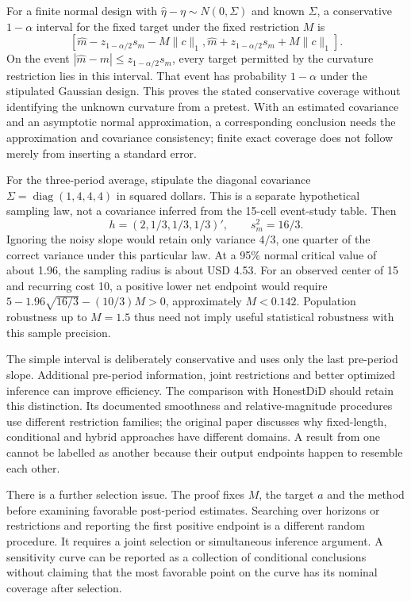 For a finite normal design with
$\widehat\eta-\eta\sim N(0,\Sigma)$ and known $\Sigma$, a conservative
$1-\alpha$ interval for the fixed target under the fixed restriction $M$ is
\begin{equation}
 \left[\widehat m-z_{1-\alpha/2}s_m-M\|c\|_1,
       \widehat m+z_{1-\alpha/2}s_m+M\|c\|_1\right].
 \label{exec17:s6-normal-interval}
\end{equation}
On the event $|\widehat m-m|\leq z_{1-\alpha/2}s_m$, every target
permitted by the curvature restriction lies in this interval. That event
has probability $1-\alpha$ under the stipulated Gaussian design. This
proves the stated conservative coverage without identifying the unknown
curvature from a pretest. With an estimated covariance and an asymptotic
normal approximation, a corresponding conclusion needs the approximation
and covariance consistency; finite exact coverage does not follow merely
from inserting a standard error.

For the three-period average, stipulate the diagonal covariance
$\Sigma=\operatorname{diag}(1,4,4,4)$ in squared dollars. This is a
separate hypothetical sampling law, not a covariance inferred from the
15-cell event-study table. Then
\begin{equation}
 h=(2,1/3,1/3,1/3)',\qquad s_m^2=16/3.
 \label{exec17:s6-normal-design}
\end{equation}
Ignoring the noisy slope would retain only variance $4/3$, one quarter
of the correct variance under this particular law. At a 95\% normal
critical value of about 1.96, the sampling radius is about USD 4.53.
For an observed center of 15 and recurring cost 10, a positive lower
net endpoint would require
$5-1.96\sqrt{16/3}-(10/3)M>0$, approximately $M<0.142$.
Population robustness up to $M=1.5$ thus need not imply useful statistical
robustness with this sample precision.

The simple interval is deliberately conservative and uses only the last
pre-period slope. Additional pre-period information, joint restrictions and
better optimized inference can improve efficiency. The comparison with
HonestDiD should retain this distinction. Its documented smoothness and
relative-magnitude procedures use different restriction families; the original
paper discusses why fixed-length, conditional and hybrid approaches have
different domains. A result from one cannot be labelled as another because
their output endpoints happen to resemble each other.~\citep{rambachan2023,sw_honestdid}

There is a further selection issue. The proof fixes $M$, the target $a$
and the method before examining favorable post-period estimates. Searching
over horizons or restrictions and reporting the first positive endpoint is
a different random procedure. It requires a joint selection or simultaneous
inference argument. A sensitivity curve can be reported as a collection of
conditional conclusions without claiming that the most favorable point on
the curve has its nominal coverage after selection.

